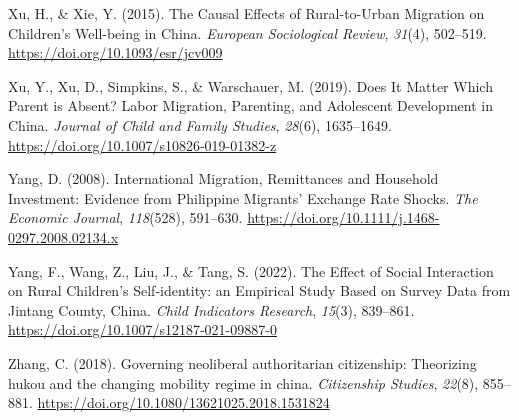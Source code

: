 \documentclass[
  man,floatsintext]{apa7}
\newlength{\cslhangindent}
\newlength{\cslentryspacingunit} %
\newenvironment{CSLReferences}[2] %
 {%
  \setlength{\parindent}{0pt}
  \ifodd #1
  \let\oldpar\par
  \def\par{\hangindent=\cslhangindent\oldpar}
  \fi
  \setlength{\parskip}{#2\cslentryspacingunit}
 }%
 {}
\begin{document}
\begin{CSLReferences}{1}{0}
\leavevmode{}%
Xu, H., \& Xie, Y. (2015). The Causal Effects of Rural-to-Urban Migration on Children{'}s Well-being in China. \emph{European Sociological Review}, \emph{31}(4), 502--519. \url{https://doi.org/10.1093/esr/jcv009}

\leavevmode{}%
Xu, Y., Xu, D., Simpkins, S., \& Warschauer, M. (2019). Does It Matter Which Parent is Absent? Labor Migration, Parenting, and Adolescent Development in China. \emph{Journal of Child and Family Studies}, \emph{28}(6), 1635--1649. \url{https://doi.org/10.1007/s10826-019-01382-z}

\leavevmode{}%
Yang, D. (2008). International Migration, Remittances and Household Investment: Evidence from Philippine Migrants{'} Exchange Rate Shocks. \emph{The Economic Journal}, \emph{118}(528), 591--630. \url{https://doi.org/10.1111/j.1468-0297.2008.02134.x}

\leavevmode{}%
Yang, F., Wang, Z., Liu, J., \& Tang, S. (2022). The Effect of Social Interaction on Rural Children{'}s Self-identity: an Empirical Study Based on Survey Data from Jintang County, China. \emph{Child Indicators Research}, \emph{15}(3), 839--861. \url{https://doi.org/10.1007/s12187-021-09887-0}

\leavevmode{}%
Zhang, C. (2018). Governing neoliberal authoritarian citizenship: Theorizing hukou and the changing mobility regime in china. \emph{Citizenship Studies}, \emph{22}(8), 855--881. \url{https://doi.org/10.1080/13621025.2018.1531824}

\end{CSLReferences}
\end{document}
